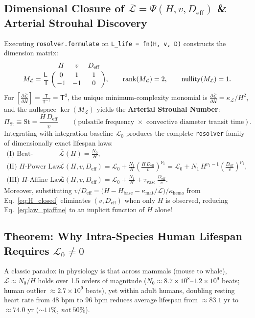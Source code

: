 \documentclass[11pt,a4paper]{article}
\newcommand{\pd}[2]{\frac{\partial #1}{\partial #2}}
\newcommand{\dimbr}[1]{\left[#1\right]}
\newcommand{\Lbar}{\bar{\mathcal{L}}}
\newcommand{\Deff}{D_{\mathrm{eff}}}
\newcommand{\St}{\mathrm{St}}
\begin{document}
\subsection{Dimensional Closure of $\Lbar = \Psi(H, v, \Deff)$ \& Arterial Strouhal Discovery}
Executing \texttt{rosolver.formulate} on \texttt{L\_life = fn(H, v, D)} constructs the dimension matrix:
\begin{equation}
  M_{\mathcal{L}} = \bordermatrix{
    & H & v & \Deff \cr
    \mathsf{L} & 0 & 1 & 1 \cr
    \mathsf{T} & -1 & -1 & 0
  },
  \qquad \mathrm{rank}(M_{\mathcal{L}}) = 2, \qquad \mathrm{nullity}(M_{\mathcal{L}}) = 1.
\end{equation}
For $\dimbr{\pd{\Lbar}{H}} = \frac{\mathsf{T}}{\mathsf{T}^{-1}} = \mathsf{T}^2$, the unique minimum-complexity monomial is $\pd{\Lbar}{H} = \kappa_{\mathcal{L}}/H^2$, and the nullspace $\ker(M_{\mathcal{L}})$ yields the \textbf{Arterial Strouhal Number}:
\begin{equation}
  \Pi_{\St} \equiv \St = \frac{H\,\Deff}{v} \qquad (\text{pulsatile frequency } \times \text{ convective diameter transit time}).
  \label{eq:strouhal}
\end{equation}
Integrating with integration baseline $\mathcal{L}_0$ produces the complete \texttt{rosolver} family of dimensionally exact lifespan laws:
\begin{align}
  \text{(I) Beat-Budget:}\quad
  &\Lbar(H) = \frac{N_0}{H}, \label{eq:law_beat}\\[4pt]
  \text{(II) $\Pi$-Power Law:}\quad
  &\Lbar(H, v, \Deff) = \mathcal{L}_0 + \frac{N_1}{H}\!\left(\frac{H\,\Deff}{v}\right)^{\!\nu_1}
   = \mathcal{L}_0 + N_1\,H^{\nu_1 - 1}\!\left(\frac{\Deff}{v}\right)^{\!\nu_1}, \label{eq:law_pipower}\\[4pt]
  \text{(III) $\Pi$-Affine Law:}\quad
  &\Lbar(H, v, \Deff) = \mathcal{L}_0 + \frac{N_1}{H} + \tau_{\mathrm{vasc}}\,\frac{\Deff}{v}. \label{eq:law_piaffine}
\end{align}
Moreover, substituting $v/\Deff = \bigl(H - H_{\mathrm{base}} - \kappa_{\mathrm{mat}}/\Lbar\bigr)/\kappa_{\mathrm{hemo}}$ from Eq.~\eqref{eq:H_closed} eliminates $(v, \Deff)$ when only $H$ is observed, reducing Eq.~\eqref{eq:law_piaffine} to an implicit function of $H$ alone!

\subsection{Theorem: Why Intra-Species Human Lifespan Requires $\mathcal{L}_0 \neq 0$}
A classic paradox in physiology is that across mammals (mouse to whale), $\Lbar \approx N_0 / H$ holds over 1.5 orders of magnitude ($N_0 \approx 8.7\times 10^8\text{--}1.2\times 10^9$ beats; human outlier $\approx 2.7\times 10^9$ beats), yet within adult humans, doubling resting heart rate from $48\text{ bpm}$ to $96\text{ bpm}$ reduces average lifespan from $\approx 83.1\text{ yr}$ to $\approx 74.0\text{ yr}$ ($\sim 11\%$, \emph{not} $50\%$).
\end{document}
